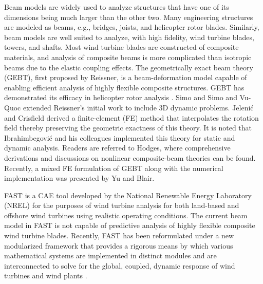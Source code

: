 \documentclass{aiaa-tc}
\begin{document}
Beam models are widely used to analyze structures that have one of its
dimensions being much larger than the other two.  Many engineering
structures are modeled as beams, e.g.,  bridges, joists, and helicopter
rotor blades.  Similarly, beam models are well suited to analyze, with high
fidelity,  wind turbine blades, towers, and shafts.  Most wind turbine
blades are constructed of composite materials, and analysis of composite
beams is more complicated than isotropic beams due to the elastic coupling
effects.  The geometrically exact beam theory (GEBT), first proposed by
Reissner\cite{Ressiner1973}, is a beam-deformation model capable of
enabling efficient analysis of highly flexible composite structures.
GEBT has demonstrated its efficacy in helicopter rotor analysis \cite{Hodges:2007}. 
Simo\cite{Simo1985} and Simo and Vu-Quoc\cite{Simo1986} extended Reissner's
initial work to include 3D dynamic problems. Jeleni\'c and
Crisfield\cite{Crisfield1999} derived a finite-element (FE) method that
interpolates the rotation field thereby preserving the geometric exactness
of this theory. It is noted that Ibrahimbegovi\'c and his colleagues
implemented this theory for static\cite{Ibrahim1995} and
dynamic\cite{Ibrahim1998} analysis. Readers are referred to
Hodges\cite{HodgesBeamBook}, where comprehensive derivations and discussions
on nonlinear composite-beam theories can be found. Recently, a mixed
 FE formulation of GEBT along with the numerical implementation was presented by
Yu and Blair\cite{YuGEBT}.  

FAST is a CAE tool developed by the National Renewable Energy Laboratory
(NREL) for the purposes of wind turbine analysis for both land-based and
offshore wind turbines using realistic operating conditions.  The current
beam model in FAST is not capable of predictive analysis of highly flexible
composite wind turbine blades.
Recently, FAST has been reformulated under a
new modularized framework that provides a rigorous means by which various
mathematical systems are implemented in distinct modules and are interconnected
to solve for the global, coupled, dynamic response of wind turbines and wind
plants \cite{Jonkman:2013,website:FASTModularizationFramework}.
\end{document}

